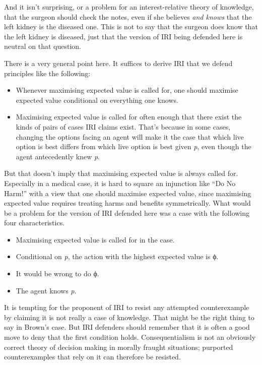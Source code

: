 \documentclass[
  11pt,
  letterpaper,
  DIV=11,
  numbers=noendperiod,
  twoside]{scrartcl}
\providecommand{\tightlist}{%
  \setlength{\itemsep}{0pt}\setlength{\parskip}{0pt}}
\begin{document}
And it isn't surprising, or a problem for an interest-relative theory of
knowledge, that the surgeon should check the notes, even if she believes
\emph{and knows} that the left kidney is the diseased one. This is not
to say that the surgeon does know that the left kidney is diseased, just
that the version of IRI being defended here is neutral on that question.

There is a very general point here. It suffices to derive IRI that we
defend principles like the following:

\begin{itemize}
\tightlist
\item
  Whenever maximising expected value is called for, one should maximise
  expected value conditional on everything one knows.
\item
  Maximising expected value is called for often enough that there exist
  the kinds of pairs of cases IRI claims exist. That's because in some
  cases, changing the options facing an agent will make it the case that
  which live option is best differs from which live option is best given
  \emph{p}, even though the agent antecedently knew \emph{p}.
\end{itemize}

But that doesn't imply that maximising expected value is always called
for. Especially in a medical case, it is hard to square an injunction
like ``Do No Harm!'' with a view that one should maximise expected
value, since maximising expected value requires treating harms and
benefits symmetrically. What would be a problem for the version of IRI
defended here was a case with the following four characteristics.

\begin{itemize}
\tightlist
\item
  Maximising expected value is called for in the case.
\item
  Conditional on \emph{p}, the action with the highest expected value is
  ϕ.
\item
  It would be wrong to do ϕ.
\item
  The agent knows \emph{p}.
\end{itemize}

It is tempting for the proponent of IRI to resist any attempted
counterexample by claiming it is not really a case of knowledge. That
might be the right thing to say in Brown's case. But IRI defenders
should remember that it is often a good move to deny that the first
condition holds. Consequentialism is not an obviously correct theory of
decision making in morally fraught situations; purported counterexamples
that rely on it can therefore be resisted.
\end{document}
